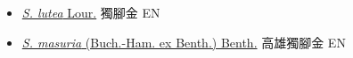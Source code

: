 \begin{itemize}
  \begin{itemize}
        \item[] \href{http://www.theplantlist.org/tpl1.1/search?q=Striga+lutea}{\textit{S. lutea} Lour.}   獨腳金 EN
        \item[] \href{http://www.theplantlist.org/tpl1.1/search?q=Striga+masuria}{\textit{S. masuria} (Buch.-Ham. ex Benth.) Benth.}   高雄獨腳金 EN
  \end{itemize}
  \end{itemize}
